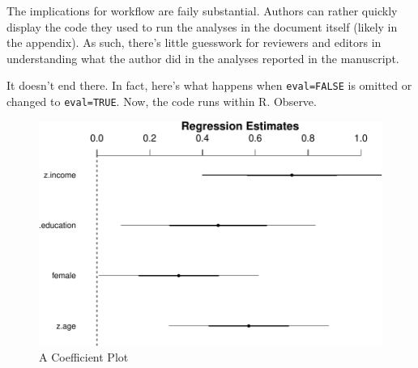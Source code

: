 \documentclass[11pt,]{article}
\makeatletter
\newenvironment{Shaded}{\begin{snugshade}}{\end{snugshade}}
\newcommand{\KeywordTok}[1]{\textcolor[rgb]{0.13,0.29,0.53}{\textbf{{#1}}}}
\newcommand{\DataTypeTok}[1]{\textcolor[rgb]{0.13,0.29,0.53}{{#1}}}
\newcommand{\StringTok}[1]{\textcolor[rgb]{0.31,0.60,0.02}{{#1}}}
\newcommand{\NormalTok}[1]{{#1}}
\def\maxwidth{\ifdim\Gin@nat@width>\linewidth\linewidth
\else\Gin@nat@width\fi}
\let\Oldincludegraphics\includegraphics
\renewcommand{\includegraphics}[1]{\Oldincludegraphics[width=\maxwidth]{#1}}
\makeatother
\begin{document}
The implications for workflow are faily substantial. Authors can rather
quickly display the code they used to run the analyses in the document
itself (likely in the appendix). As such, there's little guesswork for
reviewers and editors in understanding what the author did in the
analyses reported in the manuscript.

It doesn't end there. In fact, here's what happens when
\texttt{eval=FALSE} is omitted or changed to \texttt{eval=TRUE}. Now,
the code runs within R. Observe.

\begin{Shaded}
\end{Shaded}

\begin{figure}
\centering
\includegraphics{svm-rmarkdown-article-example_files/figure-latex/unnamed-chunk-3-1.pdf}
\caption{A Coefficient Plot}
\end{figure}
\end{document}
